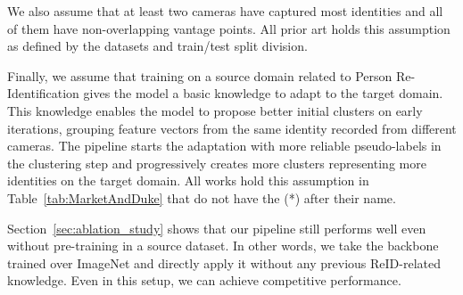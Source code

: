 \documentclass[journal]{IEEEtran}
\begin{document}
We also assume that at least two cameras have captured most identities and all of them have non-overlapping vantage points. All prior art holds this assumption as defined by the datasets and train/test split division.

Finally, we assume that training on a source domain related to Person Re-Identification gives the model a basic knowledge to adapt to the target domain. This knowledge enables the model to propose better initial clusters on early iterations, grouping feature vectors from the same identity recorded from different cameras. The pipeline starts the adaptation with more reliable pseudo-labels in the clustering step and progressively creates more clusters representing more identities on the target domain. All works hold this assumption in Table~\ref{tab:MarketAndDuke} that do not have the (*) after their name. 

Section~\ref{sec:ablation_study} shows that our pipeline still performs well even without pre-training in a source dataset. In other words, we take the backbone trained over ImageNet and directly apply it without any previous ReID-related knowledge. Even in this setup, we can achieve competitive performance.
\end{document}
